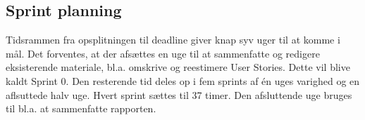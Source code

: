 \subsection{Sprint planning}
Tidsrammen fra opsplitningen til deadline giver knap syv uger til at komme i mål. 
Det forventes, at der afsættes en uge til at sammenfatte og redigere eksisterende materiale, bl.a. omskrive og reestimere User Stories. Dette vil blive kaldt Sprint 0.
Den resterende tid deles op i fem sprints af én uges varighed og en aflsuttede halv uge. Hvert sprint sættes til 37 timer. Den afsluttende uge bruges til bl.a. at sammenfatte rapporten.